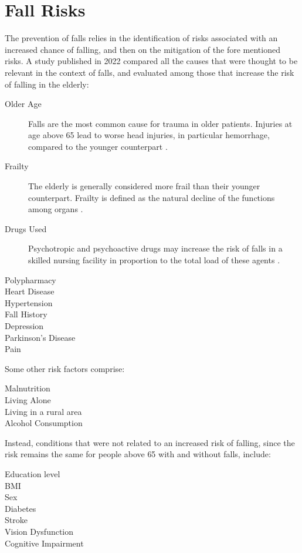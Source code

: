 \section{Fall Risks}
The prevention of falls relies in the identification of risks associated with an increased chance of falling, and then on the mitigation of the fore mentioned risks.
A study published in 2022 \cite{RiskFactors} compared all the causes that were thought to be relevant in the context of falls, and evaluated among those that increase the risk of falling in the elderly:
\begin{description}
   \item[Older Age] Falls are the most common cause for trauma in older patients. Injuries at age above 65 lead to worse head injuries, in particular hemorrhage, compared to the younger counterpart \cite{geriatricTrauma}.
   \item[Frailty] The elderly is generally considered more frail than their younger counterpart. Frailty is defined as the natural decline of the functions among organs \cite{geriatricTrauma}.
   \item[Drugs Used] Psychotropic and psychoactive drugs may increase the risk of falls in a skilled nursing facility in proportion to the total load of these agents \cite{drugsEffects}.
   \item[Polypharmacy]
   \item[Heart Disease]
   \item[Hypertension]
   \item[Fall History]
   \item[Depression]
   \item[Parkinson's Disease]
   \item[Pain]
\end{description}

Some other risk factors comprise:
\begin{description}
  \item[Malnutrition]
  \item[Living Alone]
  \item[Living in a rural area]
  \item[Alcohol Consumption]
\end{description}

Instead, conditions that were not related to an increased risk of falling, since the risk remains the same for people above 65 with and without falls, include:
\begin{description}
  \item[Education level]
  \item[BMI]
  \item[Sex]
  \item[Diabetes]
  \item[Stroke]
  \item[Vision Dysfunction]
  \item[Cognitive Impairment]
\end{description}

